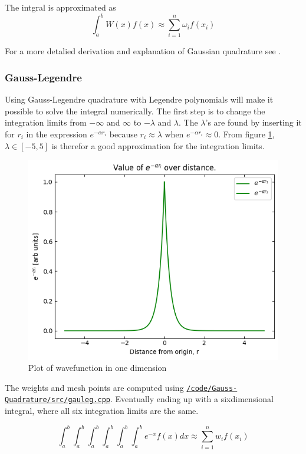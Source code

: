 \documentclass[../main.tex]{subfiles}
\begin{document}
The intgral is approximated as
\[\int_a^b W(x)f(x) \approx \sum_{i=1}^n \omega_i f(x_i) \]

For a more detalied derivation and explanation of Gaussian quadrature see \cite{MortenMC2019}.


\subsubsection{Gauss-Legendre}\label{sec:GLQ}
Using Gauss-Legendre quadrature with Legendre polynomials will make it possible to solve the integral numerically. The first step is to change the integration limits from  $-\infty$ and $\infty$ to $-\lambda$ and $\lambda$. The $\lambda$'s are found by inserting it for $r_i$ in the expression $e^{-\alpha r_i}$ because $r_i \approx \lambda$ when $e^{-\alpha r_i} \approx 0$. From figure \ref{fig:plot}, $\lambda \in [-5,5]$ is therefor a good approximation for the integration limits.

\begin{figure}[!h]
  \includegraphics{img/expfunc_plot.png}
  \caption{Plot of wavefunction in one dimension}
  \label{fig:plot}
\end{figure}
\FloatBarrier


The  weights and mesh points are computed using \href{https://github.com/kmaasrud/Project-3/blob/master/code/Gauss-Quadrature/src/gauleg.cpp}{\texttt{/code/Gauss-Quadrature/src/gauleg.cpp}}. Eventually ending up with a sixdimensional integral, where all six integration limits are the same.

\[\int_a^b\int_a^b\int_a^b\int_a^b\int_a^b\int_a^b e^{-x}f(x)dx \approx \sum_{i=1}^n w_i f(x_i)\]
\end{document}
